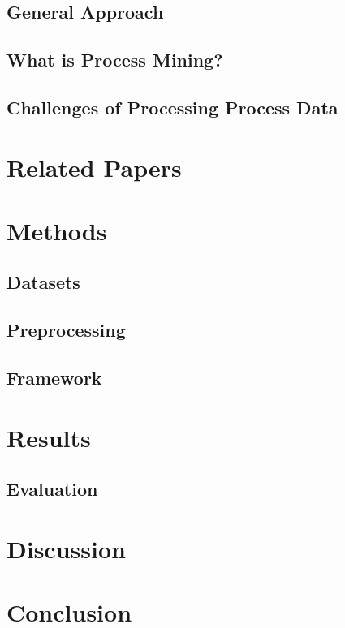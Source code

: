 \documentclass[12pt,a4paper]{report}
\begin{document}
\section{General Approach}

\section{What is Process Mining?}

\section{Challenges of Processing Process Data}

\chapter{Related Papers}


\chapter{Methods}
\label{sec:methods}

\section{Datasets}
\label{sec:datasets}

\section{Preprocessing}
\label{sec:preprocessing}

\section{Framework}

\chapter{Results}
\label{sec:results}

\section{Evaluation}
\label{subsec:evaluation}


\chapter{Discussion}
\label{sec:dicussion}


\chapter{Conclusion}
\label{sec:conclusion}


\printbibliography

\appendix
\end{document}
